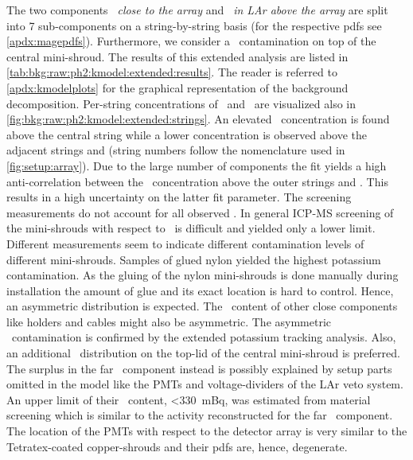The two components \emph{\kvn\ close to the array} and \emph{\kvz\ in LAr above the array}
are split into 7 sub-components on a string-by-string basis (for the respective pdfs see
\cref{apdx:magepdfs}). Furthermore, we consider a \kvn\ contamination on top of the
central mini-shroud.  The results of this extended analysis are listed in
\cref{tab:bkg:raw:ph2:kmodel:extended:results}. The reader is referred to
\cref{apdx:kmodelplots} for the graphical representation of the background decomposition.
Per-string concentrations of \kvn\ and \kvz\ are visualized also in
\cref{fig:bkg:raw:ph2:kmodel:extended:strings}.  An elevated \kvz\ concentration is found
above the central string while a lower concentration is observed above the adjacent
strings  and  (string numbers follow the nomenclature used in
\cref{fig:setup:array}). Due to the large number of components the fit yields a high
anti-correlation between the \kvz\ concentration above the outer strings and . This
results in a high uncertainty on the latter fit parameter.
\newpar
The screening measurements do not account for all observed \kvn. In general ICP-MS
screening of the mini-shrouds with respect to \kvn\ is difficult and yielded only a lower
limit. Different measurements seem to indicate different contamination levels of different
mini-shrouds.  Samples of glued nylon yielded the highest potassium contamination. As the
gluing of the nylon mini-shrouds is done manually during installation the amount of glue
and its exact location is hard to control. Hence, an asymmetric distribution is expected.
The \kvn\ content of other close components like holders and cables might also be
asymmetric. The asymmetric \kvn\ contamination is confirmed by the extended potassium
tracking analysis. Also, an additional \kvn\ distribution on the top-lid of the central
mini-shroud is preferred.  The surplus in the far \kvn\ component instead is possibly explained
by setup parts omitted in the model like the PMTs and voltage-dividers of the LAr veto
system. An upper limit of their \kvn\ content, <330~mBq, was estimated from material
screening which is similar to the activity reconstructed for the far \kvn\ component. The
location of the PMTs with respect to the detector array is very similar to the
Tetratex\reg-coated copper-shrouds and their pdfs are, hence, degenerate.

\begin{table}
  \centering
  \caption{%
    Summary of the fit parameters estimated with the potassium source tracking analysis
    (extended model). The type of prior distribution is indicated with \m{[f]}: flat,
    \m{[g]}: Gaussian. ($\,^{\dagger}$ Tetratex\reg-coated)
  }\label{tab:bkg:raw:ph2:kmodel:extended:results}
  
\end{table}

